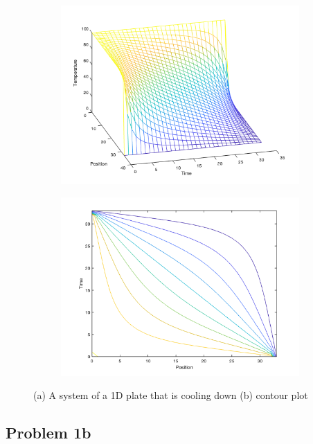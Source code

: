 \documentclass[12pt]{article}
\begin{document}
\begin{figure}[h!]
\centering

\begin{subfigure}{0.49\columnwidth}
\centering
\includegraphics[width=\textwidth]{problem1_1.png}
\label{fig:time1}
\end{subfigure}\hfill
\begin{subfigure}{0.49\columnwidth}
\centering
\includegraphics[width=\textwidth]{problem1_2.png}
\end{subfigure}
\caption{(a) A system of a 1D plate that is cooling down (b) contour plot}
\end{figure}

\subsection*{Problem 1b}
\end{document}
